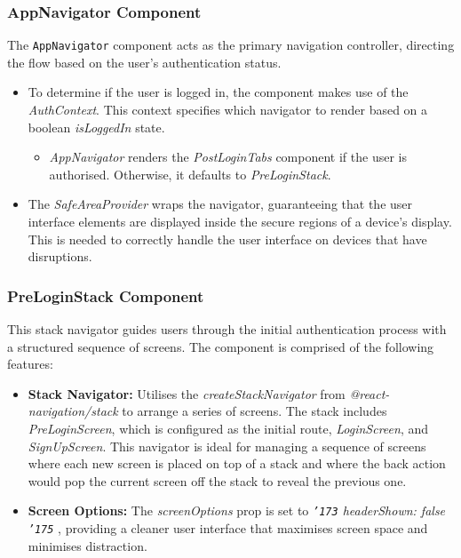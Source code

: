 \subsubsection{AppNavigator Component}

The \texttt{AppNavigator} component acts as the primary navigation controller, directing the flow based on the user's authentication status.

\begin{itemize}
    \item To determine if the user is logged in, the component makes use of the \textit{AuthContext}. This context specifies which navigator to render based on a boolean \textit{isLoggedIn} state.
    \begin{itemize}
        \item \textit{AppNavigator} renders the \textit{PostLoginTabs} component if the user is authorised. Otherwise, it defaults to \textit{PreLoginStack}.
    \end{itemize}
    \item The \textit{SafeAreaProvider} wraps the navigator, guaranteeing that the user interface elements are displayed inside the secure regions of a device's display. This is needed to correctly handle the user interface on devices that have disruptions.
\end{itemize}

\subsubsection{PreLoginStack Component}

This stack navigator guides users through the initial authentication process with a structured sequence of screens. The component is comprised of the following features:

\begin{itemize}
    \item \textbf{Stack Navigator:} Utilises the \textit{createStackNavigator} from \textit{@react-navigation/stack} to arrange a series of screens. The stack includes \textit{PreLoginScreen}, which is configured as the initial route, \textit{LoginScreen}, and \textit{SignUpScreen}. This navigator is ideal for managing a sequence of screens where each new screen is placed on top of a stack and where the back action would pop the current screen off the stack to reveal the previous one.    
    \item \textbf{Screen Options:} The \textit{screenOptions} prop is set to \textit{ {\tt {\char '173}} headerShown: false {\tt {\char '175}} }, providing a cleaner user interface that maximises screen space and minimises distraction.
\end{itemize}

